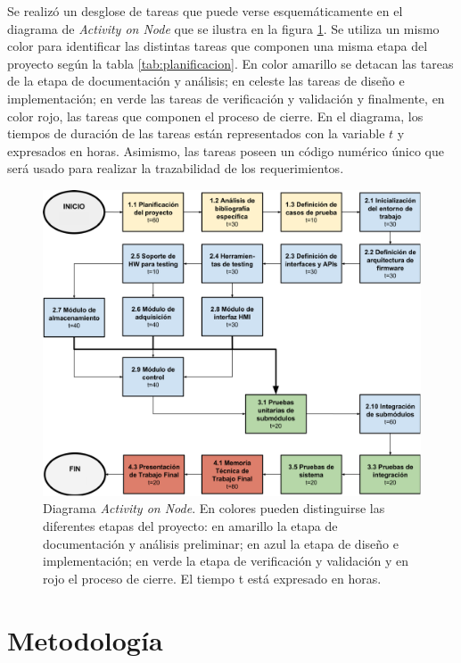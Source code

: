 Se realizó un desglose de tareas que puede verse esquemáticamente en el diagrama de \textit{Activity on Node} que se ilustra en la figura \ref{fig:AoN}. Se utiliza un mismo color para identificar las distintas tareas que componen una misma etapa del proyecto según la tabla \ref{tab:planificacion}. En color amarillo se detacan las tareas de la etapa de documentación y análisis; en celeste las tareas de diseño e implementación; en verde las tareas de verificación y validación y finalmente, en color rojo, las tareas que componen el proceso de cierre. En el diagrama, los tiempos de duración de las tareas están representados con la variable $t$ y expresados en horas. Asimismo, las tareas poseen un código numérico único que será usado para realizar la trazabilidad de los requerimientos.

\begin{figure}[h]
	\centering
	\includegraphics[width=\textwidth]{./Figures/AoN.pdf}
	\caption[Diagrama \textit{Activity on Node}.]{Diagrama \textit{Activity on Node}.  En colores pueden distinguirse las diferentes etapas del proyecto: en amarillo la etapa de documentación y análisis preliminar; en azul la etapa de diseño e implementación; en verde la etapa de verificación y validación y en rojo el proceso de cierre. El tiempo t está expresado en horas.}
	\label{fig:AoN}
\end{figure}

\clearpage
\section{Metodología}

